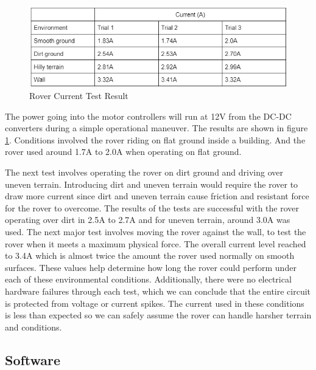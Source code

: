 \documentclass[a4paper, 10pt]{article}
\begin{document}
		\begin{figure} [!h]
			\centering
			\includegraphics[scale=0.8]{Photos/Rover current test}
			\caption{Rover Current Test Result}
			\label{Rover test}
		\end{figure}

	The power going into the motor controllers will run at 12V from the DC-DC converters during a simple operational maneuver. The results are shown in figure \ref{Rover test}. Conditions involved the rover riding on flat ground inside a building. And the rover used around 1.7A to 2.0A when operating on flat ground. 
	
	The next test involves operating the rover on dirt ground and driving over uneven terrain. Introducing dirt and uneven terrain would require the rover to draw more current since dirt and uneven terrain cause friction and resistant force for the rover to overcome. The results of the tests are successful with the rover operating over dirt in 2.5A to 2.7A and for uneven terrain, around 3.0A was used. The next major test involves moving the rover against the wall, to test the rover when it meets a maximum physical force. The overall current level reached to 3.4A which is almost twice the amount the rover used normally on smooth surfaces. These values help determine how long the rover could perform under each of these environmental conditions. Additionally, there were no electrical hardware failures through each test, which we can conclude that the entire circuit is protected from voltage or current spikes. The current used in these conditions is less than expected so we can safely assume the rover can handle harsher terrain and conditions.

    \subsection{Software}
\end{document}

